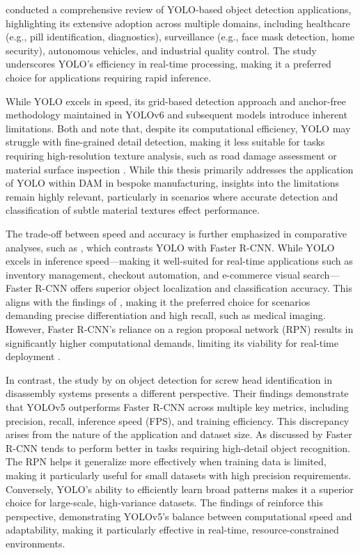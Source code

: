 \documentclass[a4paper,10pt,twocolumn]{article}
\numberwithin{figure}{section}
\numberwithin{table}{section}
\begin{document}
 \cite{Sapkota2025YOLOv11} conducted a comprehensive review of YOLO-based 
 object detection applications, highlighting its extensive adoption across 
 multiple domains, including healthcare (e.g., pill identification, diagnostics), 
 surveillance (e.g., face mask detection, home security), 
 autonomous vehicles, and industrial quality control. 
 The study underscores YOLO’s efficiency in real-time processing, 
 making it a preferred choice for applications requiring rapid inference.

 While YOLO excels in speed, its grid-based detection approach and anchor-free
  methodology maintained in YOLOv6 and subsequent models introduce inherent limitations. 
  Both \cite{Sapkota2025YOLOv11}
   and \cite{he2024comprehensiveperformanceevaluationyolov11} note that, despite 
   its computational efficiency, YOLO may struggle with fine-grained detail detection, 
   making it less suitable for tasks requiring high-resolution texture analysis, 
   such as road damage assessment or material surface inspection \citep{Angulo_2019}. 
   While this thesis primarily addresses the application of YOLO within DAM in bespoke manufacturing, 
   insights into the limitations remain highly relevant, particularly in scenarios 
   where accurate detection and classification of subtle material textures effect performance.
    
   The trade-off between speed and accuracy is further emphasized in comparative 
   analyses, such as \cite{articleRANE}, which contrasts YOLO with Faster R-CNN. 
   While YOLO excels in inference speed—making it well-suited for real-time applications 
   such as inventory management, checkout automation, and e-commerce visual search—Faster 
   R-CNN offers superior object localization and classification accuracy. 
   This aligns with the findings of \cite{Sapkota2025YOLOv11}, making it the preferred choice 
   for scenarios demanding precise differentiation and high recall, such as medical imaging. 
   However, Faster R-CNN's reliance on a region proposal 
   network (RPN) results in significantly higher computational demands, limiting its 
   viability for real-time deployment \citep{articleRANE}.

   In contrast, the study by \cite{KARBOUJ2024527} on object detection for screw head identification 
   in disassembly systems presents a different perspective. Their findings demonstrate that 
   YOLOv5 outperforms Faster R-CNN across multiple key metrics, including precision, recall, 
   inference speed (FPS), and training efficiency. This discrepancy arises from the nature of
   the application and dataset size. As discussed by \cite{articleRANE} Faster R-CNN tends to perform 
   better in tasks requiring high-detail object recognition. The RPN helps it generalize
   more effectively when training data is limited, making it 
   particularly useful for small datasets 
   with high precision requirements.
   Conversely, YOLO's ability to efficiently learn broad patterns makes it a superior choice for 
   large-scale, high-variance datasets. The findings of \cite{KARBOUJ2024527} reinforce this perspective, 
   demonstrating YOLOv5’s balance between computational speed and adaptability, making it 
   particularly effective in real-time, resource-constrained environments.
\end{document}
